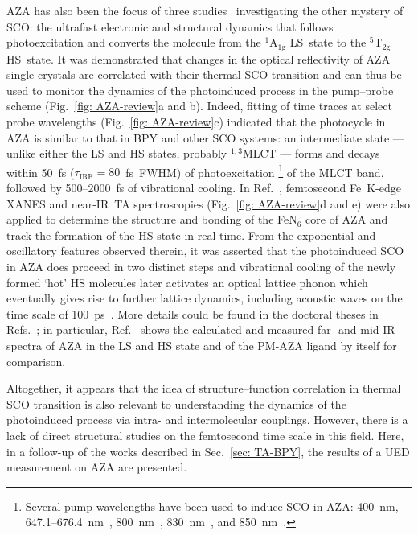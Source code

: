 AZA has also been the focus of three studies~\cite{Marino2013, Marino2016, Parpiiev2017}
investigating the other mystery of SCO:
the ultrafast electronic and structural dynamics that follows photoexcitation
and converts the molecule from the $\mathrm{^1 A_{1g}}$ LS~state
to the $\mathrm{^5 T_{2g}}$ HS~state.
%
It was demonstrated that changes in the optical reflectivity of AZA single crystals
are correlated with their thermal SCO transition and can thus be used to monitor
the dynamics of the photoinduced process in the pump--probe scheme
(Fig.~\ref{fig: AZA-review}a and b).
%
Indeed, fitting of time traces at select probe wavelengths (Fig.~\ref{fig: AZA-review}c)
indicated that the photocycle in AZA is similar to that in BPY and other SCO systems:
an intermediate state --- unlike either the LS and HS states, probably $\mathrm{^{1,3}MLCT}$ ---
forms and decays within 50~fs ($\tau_\text{IRF} = 80$~fs~FWHM) of photoexcitation%
\footnote{Several pump wavelengths have been used to induce SCO in AZA:
400~nm\cite{Parpiiev2017}, 647.1--676.4~nm~\cite{Letard1999, Capes2000},
800~nm~\cite{Marino2016, Jiang2017}, 830~nm~\cite{Marino2016}, and 850~nm~\cite{Marino2013}.}
of the MLCT band, followed by 500--2000~fs of vibrational cooling.
%
In Ref.~\cite{Marino2016}, femtosecond Fe~K-edge XANES and near-IR~TA spectroscopies
(Fig.~\ref{fig: AZA-review}d and e) were also applied to determine
the structure and bonding of the FeN$_6$ core of AZA
and track the formation of the HS state in real time.
%
From the exponential and oscillatory features observed therein,
it was asserted that the photoinduced SCO in AZA does proceed in two distinct steps
and vibrational cooling of the newly formed `hot' HS molecules later activates
an optical lattice phonon which eventually gives rise to further lattice dynamics,
including acoustic waves on the time scale of 100~ps~\cite{Parpiiev2017}.
%
More details could be found in the doctoral theses in
Refs.~\cite{Hoefer-thesis, Marino-thesis, Parpiiev-thesis};
in particular, Ref.~\cite{Hoefer-thesis} shows the calculated and measured far- and mid-IR spectra
of AZA in the LS and HS state and of the PM-AZA ligand by itself for comparison.

Altogether, it appears that the idea of structure--function correlation
in thermal SCO transition is also relevant to understanding the dynamics of the photoinduced process
via intra- and intermolecular couplings.
However, there is a lack of direct structural studies on the femtosecond time scale in this field.
%
Here, in a follow-up of the works described in Sec.~\ref{sec: TA-BPY},
the results of a UED measurement on AZA are presented.

